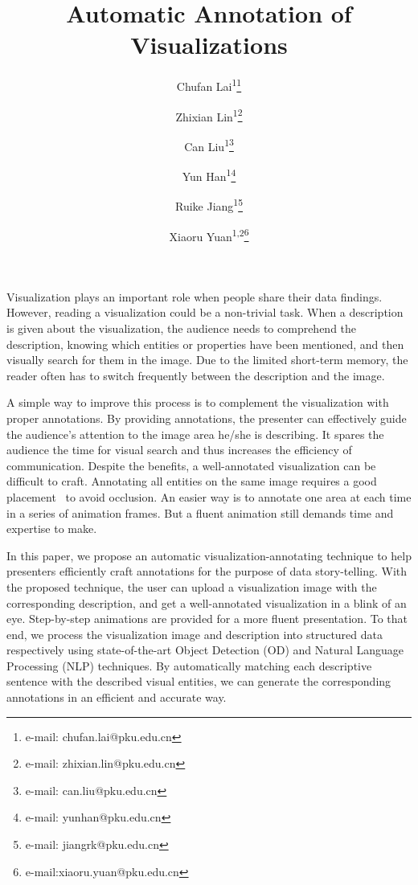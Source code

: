 \documentclass{vgtc}                          %
\title{Automatic Annotation of Visualizations}
\author{Chufan Lai\textsuperscript{1}\thanks{e-mail: chufan.lai@pku.edu.cn} %
\and{Zhixian Lin}\textsuperscript{1}\thanks{e-mail: zhixian.lin@pku.edu.cn} %
\and{Can Liu}\textsuperscript{1}\thanks{e-mail: can.liu@pku.edu.cn} %
\and{Yun Han}\textsuperscript{1}\thanks{e-mail: yunhan@pku.edu.cn} %
\and{Ruike Jiang}\textsuperscript{1}\thanks{e-mail: jiangrk@pku.edu.cn} %
\and Xiaoru Yuan\textsuperscript{1,2}\thanks{e-mail:xiaoru.yuan@pku.edu.cn}}
\affiliation{\scriptsize 1) Key Laboratory of Machine Perception (Ministry of Education), and School of EECS, Peking University \\ 2) National Engineering Laboratory for Big Data Analysis Technology and Application, Beijing, China}
\begin{document}


\maketitle

Visualization plays an important role when people share their data findings. However, reading a visualization could be a non-trivial task. When a description is given about the visualization, the audience needs to comprehend the description, knowing which entities or properties have been mentioned, and then visually search for them in the image. Due to the limited short-term memory, the reader often has to switch frequently between the description and the image.

A simple way to improve this process is to complement the visualization with proper annotations. By providing annotations, the presenter can effectively guide the audience's attention to the image area he/she is describing. It spares the audience the time for visual search and thus increases the efficiency of communication. Despite the benefits, a well-annotated visualization can be difficult to craft. Annotating all entities on the same image requires a good placement~\cite{azuma2003evaluating} to avoid occlusion. An easier way is to annotate one area at each time in a series of animation frames. But a fluent animation still demands time and expertise to make.

In this paper, we propose an automatic visualization-annotating technique to help presenters efficiently craft annotations for the purpose of data story-telling. With the proposed technique, the user can upload a visualization image with the corresponding description, and get a well-annotated visualization in a blink of an eye. Step-by-step animations are provided for a more fluent presentation. To that end, we process the visualization image and description into structured data respectively using state-of-the-art Object Detection (OD) and Natural Language Processing (NLP) techniques. By automatically matching each descriptive sentence with the described visual entities, we can generate the corresponding annotations in an efficient and accurate way.
\end{document}
